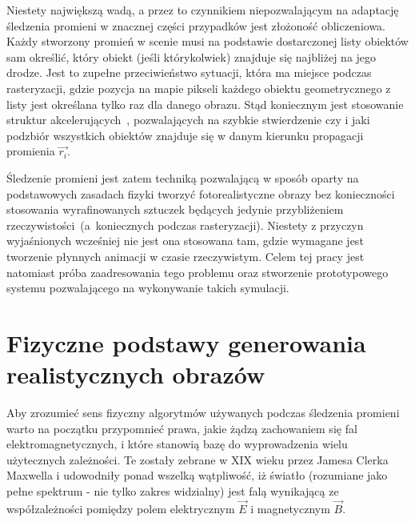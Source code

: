 Niestety największą wadą, a przez to czynnikiem niepozwalającym na adaptację śledzenia promieni w znacznej części przypadków jest złożoność obliczeniowa. Każdy stworzony promień w scenie musi na podstawie dostarczonej listy obiektów sam określić, który obiekt (jeśli którykolwiek) znajduje się najbliżej na jego drodze. Jest to zupełne przeciwieństwo sytuacji, która ma miejsce podczas rasteryzacji, gdzie pozycja na mapie pikseli każdego obiektu geometrycznego z listy jest określana tylko raz dla danego obrazu. Stąd koniecznym jest stosowanie struktur akcelerujących~\cite{FASTTREE}\cite{FAST_KDTREES}, pozwalających na szybkie stwierdzenie czy i jaki podzbiór wszystkich obiektów znajduje się w danym kierunku propagacji promienia $\vec{r_i}$.
\newline

Śledzenie promieni jest zatem techniką pozwalającą w sposób oparty na podstawowych zasadach fizyki tworzyć fotorealistyczne obrazy bez konieczności stosowania wyrafinowanych sztuczek będących jedynie przybliżeniem rzeczywistości~(a~koniecznych podczas rasteryzacji). Niestety z przyczyn wyjaśnionych wcześniej nie jest ona stosowana tam, gdzie wymagane jest tworzenie płynnych animacji w czasie rzeczywistym. Celem tej pracy jest natomiast próba zaadresowania tego problemu oraz stworzenie prototypowego systemu pozwalającego na wykonywanie takich symulacji. 
\section{Fizyczne podstawy generowania realistycznych obrazów}
Aby zrozumieć sens fizyczny algorytmów używanych podczas śledzenia promieni warto na początku przypomnieć prawa, jakie żądzą zachowaniem się fal elektromagnetycznych, i które stanowią bazę do wyprowadzenia wielu użytecznych zależności. Te zostały zebrane w XIX wieku przez Jamesa Clerka Maxwella i udowodniły ponad wszelką wątpliwość, iż światło (rozumiane jako pełne spektrum - nie tylko zakres widzialny) jest falą wynikającą ze współzależności pomiędzy polem elektrycznym $\vec{E}$ i magnetycznym $\vec{B}$. 

